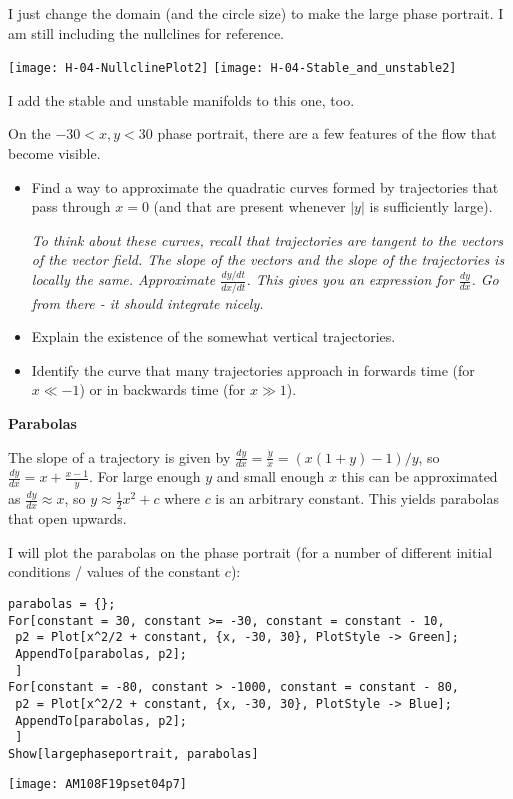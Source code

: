 \documentclass[12pt,letterpaper,answers]{exam}
\begin{document}
\begin{questions}
\begin{parts}
\begin{solution}
I just change the domain (and the circle size) to make the large phase portrait.  I am still including the nullclines for reference.

\texttt{[image: H-04-NullclinePlot2]} 
\texttt{[image: H-04-Stable\_and\_unstable2]}

I add the stable and unstable manifolds to this one, too.



\end{solution}


\item On the $-30<x,y<30$ phase portrait, there are a few features of the flow that become visible.  
\begin{itemize}
    \item Find a way to approximate the quadratic curves formed by trajectories that pass through $x=0$ (and that are present whenever $\vert y\vert$ is sufficiently large).
    
    \emph{To think about these curves, recall that trajectories are tangent to the vectors of the vector field.  The slope of the vectors and the slope of the trajectories is locally the same. Approximate $\displaystyle\frac{dy/dt}{dx/dt}$.  This gives you an expression for $\displaystyle\frac{dy}{dx}$. Go from there - it should integrate nicely.}
    
    \item Explain the existence of the somewhat vertical trajectories.
    
    \item Identify the curve that many trajectories approach in forwards time (for $x\ll -1$) or in backwards time (for $x\gg 1$). 
\end{itemize}

\begin{solution}

\textbf{Parabolas}

The slope of a trajectory is given by $\frac{dy}{dx} = \frac{\dot{y}}{\dot{x}}  = (x(1+y) - 1)/y$, so $\frac{dy}{dx} = x + \frac{x-1}{y}$.  For large enough $y$ and small enough $x$ this can be approximated as $\frac{dy}{dx}\approx x$, so $y \approx \frac{1}{2} x^2 + c$ where $c$ is an arbitrary constant.  This yields parabolas that open upwards.


I will plot the parabolas on the phase portrait (for a number of different initial conditions / values of the constant $c$):
\begin{verbatim}
parabolas = {};
For[constant = 30, constant >= -30, constant = constant - 10,
 p2 = Plot[x^2/2 + constant, {x, -30, 30}, PlotStyle -> Green];
 AppendTo[parabolas, p2];
 ]
For[constant = -80, constant > -1000, constant = constant - 80,
 p2 = Plot[x^2/2 + constant, {x, -30, 30}, PlotStyle -> Blue];
 AppendTo[parabolas, p2];
 ]
Show[largephaseportrait, parabolas]
\end{verbatim}
\texttt{[image: AM108F19pset04p7]} 



\end{solution}
\end{parts}
\end{questions}
\end{document}

